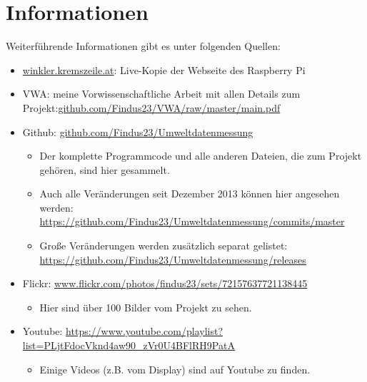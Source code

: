 \documentclass[12pt,a5paper,landscape,DIV=20]{scrartcl}
\author{Lukas Winkler}
\begin{document}
\vspace*{\fill}
\section*{Informationen}

Weiterführende Informationen gibt es unter folgenden Quellen:
\begin{itemize}
\item \href{http://winkler.kremszeile.at/}{winkler.kremszeile.at}: Live-Kopie der Webseite des Raspberry Pi
\item VWA: meine Vorwissenschaftliche Arbeit mit allen Details zum Projekt:\newline \href{https://github.com/Findus23/VWA/raw/master/main.pdf}{github.com/Findus23/VWA/raw/master/main.pdf}
\item Github: \href{https://github.com/Findus23/Umweltdatenmessung}{github.com/Findus23/Umweltdatenmessung}
	\begin{itemize}
	\item Der komplette Programmcode und alle anderen Dateien, die zum Projekt gehören, sind hier gesammelt.
	\item Auch alle Veränderungen seit Dezember 2013 können hier angesehen werden:  \url{https://github.com/Findus23/Umweltdatenmessung/commits/master}
	\item Große Veränderungen werden zusätzlich separat gelistet: \url{https://github.com/Findus23/Umweltdatenmessung/releases}
	\end{itemize}
\item Flickr: \href{https://www.flickr.com/photos/findus23/sets/72157637721138445/}{www.flickr.com/photos/findus23/sets/72157637721138445}
	\begin{itemize}
	\item Hier sind über 100 Bilder vom Projekt zu sehen.
	\end{itemize}
\item Youtube: \url{https://www.youtube.com/playlist?list=PLjtFdocVknd4aw90_zVr0U4BFlRH9PatA}
	\begin{itemize}
	\item Einige Videos (z.B. vom Display) sind auf Youtube zu finden.
	\end{itemize}
\end{itemize}
\vspace*{\fill}
\end{document}
